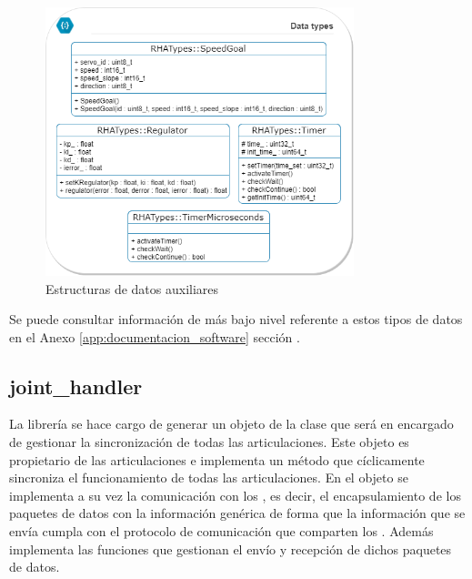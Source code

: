         \begin{figure}[H]
            \centering
            \includegraphics[width=0.8\textwidth]{figuras/SW/class_diagram_TRHA.png}   
            \caption{Estructuras de datos auxiliares}
            \label{fig:SW:class_diagram_TRHA}
        \end{figure}
        
        Se puede consultar información de más bajo nivel referente a estos tipos de datos en el Anexo \ref{app:documentacion_software} sección \completar.
    \subsection{joint\_handler} \label{subsec:SW:lib:joint_handler}
        La librería  se hace cargo de generar un objeto de la clase  que será en encargado de gestionar la sincronización de todas las articulaciones. Este objeto es propietario de las articulaciones e implementa un método que cíclicamente sincroniza el funcionamiento de todas las articulaciones. En el objeto  se implementa a su vez la comunicación con los , es decir, el encapsulamiento de los paquetes de datos con la información genérica de forma que la información que se envía cumpla con el protocolo de comunicación que comparten los . Además implementa las funciones que gestionan el envío y recepción de dichos paquetes de datos.
        
